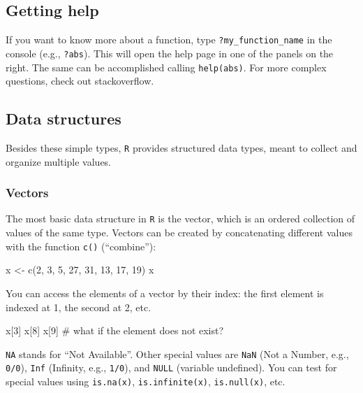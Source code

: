 \documentclass[
  letterpaper,
  DIV=11,
  numbers=noendperiod]{scrreprt}
\newenvironment{Shaded}{\begin{snugshade}}{\end{snugshade}}
\newcommand{\NormalTok}[1]{\textcolor[rgb]{0.00,0.23,0.31}{#1}}
\begin{document}
\subsection*{Getting help}\label{getting-help}

If you want to know more about a function, type
\texttt{?my\_function\_name} in the console (e.g., \texttt{?abs}). This
will open the help page in one of the panels on the right. The same can
be accomplished calling \texttt{help(abs)}. For more complex questions,
check out stackoverflow.

\subsection*{Data structures}\label{data-structures}

Besides these simple types, \texttt{R} provides structured data types,
meant to collect and organize multiple values.

\subsubsection*{Vectors}\label{vectors}

The most basic data structure in \texttt{R} is the vector, which is an
ordered collection of values of the same type. Vectors can be created by
concatenating different values with the function \texttt{c()}
(``combine''):

\begin{Shaded}
\begin{Highlighting}[]
\NormalTok{x \textless{}{-} c(2, 3, 5, 27, 31, 13, 17, 19) }
\NormalTok{x}
\end{Highlighting}
\end{Shaded}

You can access the elements of a vector by their index: the first
element is indexed at 1, the second at 2, etc.

\begin{Shaded}
\begin{Highlighting}[]
\NormalTok{x[3]}
\NormalTok{x[8]}
\NormalTok{x[9] \# what if the element does not exist?}
\end{Highlighting}
\end{Shaded}

\texttt{NA} stands for ``Not Available''. Other special values are
\texttt{NaN} (Not a Number, e.g., \texttt{0/0}), \texttt{Inf} (Infinity,
e.g., \texttt{1/0}), and \texttt{NULL} (variable undefined). You can
test for special values using \texttt{is.na(x)},
\texttt{is.infinite(x)}, \texttt{is.null(x)}, etc.
\end{document}
